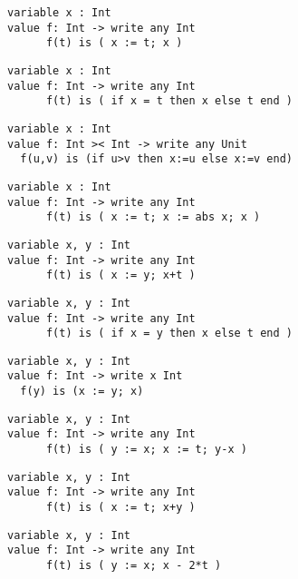 

\z \begin{lstlisting}
variable x : Int
value f: Int -> write any Int
      f(t) is ( x := t; x )
\end{lstlisting}

\z \begin{lstlisting}
variable x : Int
value f: Int -> write any Int
      f(t) is ( if x = t then x else t end )
\end{lstlisting}

\z \begin{lstlisting}
variable x : Int
value f: Int >< Int -> write any Unit
  f(u,v) is (if u>v then x:=u else x:=v end)
\end{lstlisting}

\z \begin{lstlisting}
variable x : Int
value f: Int -> write any Int
      f(t) is ( x := t; x := abs x; x )
\end{lstlisting}

\z \begin{lstlisting}
variable x, y : Int
value f: Int -> write any Int
      f(t) is ( x := y; x+t )
\end{lstlisting}

\z \begin{lstlisting}
variable x, y : Int
value f: Int -> write any Int
      f(t) is ( if x = y then x else t end )
\end{lstlisting}

\z \begin{lstlisting}
variable x, y : Int
value f: Int -> write x Int
  f(y) is (x := y; x)
\end{lstlisting}

\z \begin{lstlisting}
variable x, y : Int
value f: Int -> write any Int
      f(t) is ( y := x; x := t; y-x )
\end{lstlisting}

\z \begin{lstlisting}
variable x, y : Int
value f: Int -> write any Int
      f(t) is ( x := t; x+y )
\end{lstlisting}

\z \begin{lstlisting}
variable x, y : Int
value f: Int -> write any Int
      f(t) is ( y := x; x - 2*t )
\end{lstlisting}

